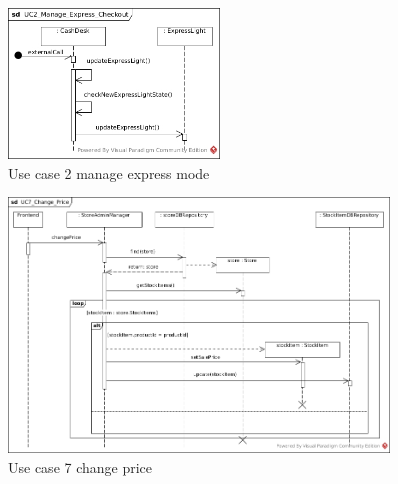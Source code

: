 			\begin{figure}[!h]
				\centering
				\includegraphics[width = 0.5\textwidth]{img/UC2_Manage_Express_Checkout.jpg}
				\caption{Use case 2 manage express mode}
				\label{MS_UC2}
			\end{figure}
			
			\begin{figure}[!h]
				\centering
				\includegraphics[width = 0.9\textwidth]{img/UC7_Change_Price.jpg}
				\caption{Use case 7 change price}
				\label{MS_UC7}
			\end{figure}
			
